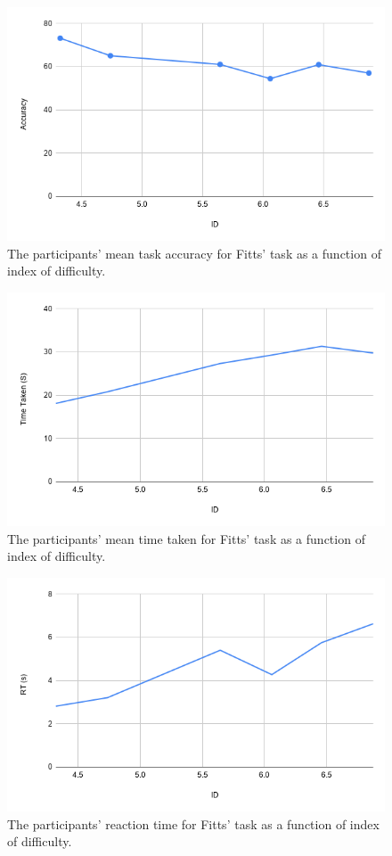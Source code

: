 \begin{figure}
\centering
  \includegraphics[width=0.6\columnwidth]{chapters/04_muifold/figures/user_study_chart_id_accuracy.png}
  \caption{The participants' mean task accuracy for Fitts' task as a function of index of difficulty.}
  \label{fig:user_study_fitts}
\end{figure}

\begin{figure}
\centering
  \includegraphics[width=0.6\columnwidth]{chapters/04_muifold/figures/user_study_fitts_time_taken.png}
  \caption{The participants' mean time taken for Fitts' task as a function of index of difficulty.}
  \label{fig:user_study_fitts_time_taken}
\end{figure}

\begin{figure}
\centering
  \includegraphics[width=0.6\columnwidth]{chapters/04_muifold/figures/user_study_fitts_rt.png}
  \caption{The participants' reaction time for Fitts' task as a function of index of difficulty.}
  \label{fig:user_study_fitts_rt}
\end{figure}

